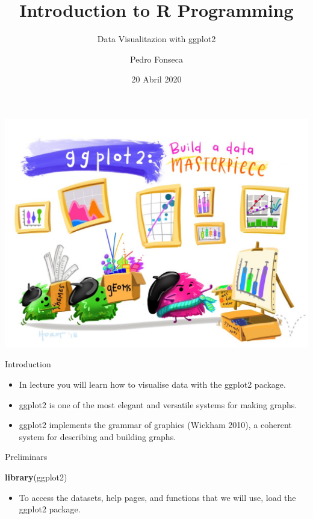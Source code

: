 \documentclass[ignorenonframetext,]{beamer}
\title{Introduction to R Programming}
\subtitle{Data Visualitazion with ggplot2}
\author{Pedro Fonseca}
\date{20 Abril 2020}
\newenvironment{Shaded}{\begin{snugshade}}{\end{snugshade}}
\newcommand{\KeywordTok}[1]{\textcolor[rgb]{0.13,0.29,0.53}{\textbf{#1}}}
\newcommand{\NormalTok}[1]{#1}
\providecommand{\tightlist}{%
  \setlength{\itemsep}{0pt}\setlength{\parskip}{0pt}}
\begin{document}
\frame{\titlepage}

\begin{frame}

\includegraphics{figures/pic.png}

\end{frame}

\begin{frame}{Introduction}
\protect\hypertarget{introduction}{}

\begin{itemize}
\item
  In lecture you will learn how to visualise data with the ggplot2
  package.
\item
  ggplot2 is one of the most elegant and versatile systems for making
  graphs.
\item
  ggplot2 implements the grammar of graphics (Wickham 2010), a coherent
  system for describing and building graphs.
\end{itemize}

\end{frame}

\begin{frame}[fragile]{Preliminars}
\protect\hypertarget{preliminars}{}

\begin{Shaded}
\begin{Highlighting}[]
\KeywordTok{library}\NormalTok{(ggplot2)}
\end{Highlighting}
\end{Shaded}

\begin{itemize}
\tightlist
\item
  To access the datasets, help pages, and functions that we will use,
  load the ggplot2 package.
\end{itemize}

\end{frame}
\end{document}
